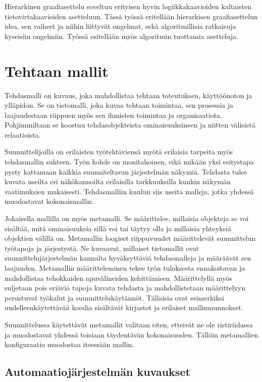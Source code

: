 \documentclass[finnish,12pt]{article}
\begin{document}
Hierarkinen graafiasettelu soveltuu erityisen hyvin logiikkakaavioiden kaltaisten tietovirtakaavioiden asetteluun.
Tässä työssä eritellään hierarkisen graafiasettelun idea, sen vaiheet ja niihin liittyvät ongelmat, sekä algoritmillisia ratkaisuja kyseisiin ongelmiin.
Työssä esitellään myös algoritmin tuottamia asetteluja.

	\clearpage
	\section{Tehtaan mallit}

Tehdasmalli on kuvaus, joka mahdollistaa tehtaan toteutuksen, käyttöönoton ja ylläpidon.
Se on tietomalli, joka kuvaa tehtaan toimintaa, sen prosessia ja laajuudestaan riippuen myös sen ihmisten toimintaa ja organisaatiota.
Pohjimmiltaan se koostuu tehdasobjekteista ominaisuuksineen ja niitten välisistä relaatioista. \cite{RefWorks:41}

Suunnittelijoilla on erilaisten työtehtäviensä myötä erilaisia tarpeita myös tehdasmallin suhteen.
Työn kohde on monitahoinen, eikä mikään yksi esitystapa pysty kattamaan kaikkia suunniteltavan järjestelmän näkymiä.
Tehdasta tulee kuvata useilta eri näkökannoilta erilaisilla tarkkuuksilla kunkin näkymän vaatimuksien mukaisesti.
Tehdasmalliin kuuluu siis useita malleja, jotka yhdessä muodostavat kokonaismallin.

Jokaisella mallilla on myös metamalli. Se määrittelee, millaisia objekteja se voi sisältää, mitä ominaisuuksia sillä voi tai täytyy olla ja millaisia yhteyksiä objektien välillä on.
Metamallin loogiset riippuvuudet määrittelevät suunnittelun työtapoja ja järjestystä.
Ne kuvaavat, millaiset tietomallit ovat suunnittelujärjestelmän kannalta hyväksyttäviä tehdasmalleja ja
määräävät sen laajuuden. Metamallin määritteleminen tekee työn tuloksesta ennakoitavan ja mahdollistaa tehokkaiden apuvälineiden kehittämisen.
Määrittelyllä myös suljetaan pois eriäviä tapoja kuvata tehdasta ja mahdollistetaan määrittelyyn perustuvat työkalut ja suunnittelukäytännöt.
Tällaisia ovat esimerkiksi uudelleenkäytettävää koodia sisältävät kirjastot ja erilaiset mallimuunnokset.

Suunnittelussa käytettävät metamallit valitaan siten, etteivät ne ole ristiriidassa ja muodostavat yhdessä toisiaan täydentävän kokonaisuuden.
Tällöin metamallien konfiguraatio muodostaa itsessään mallin.


	\subsection{Automaatiojärjestelmän kuvaukset}
\end{document}
